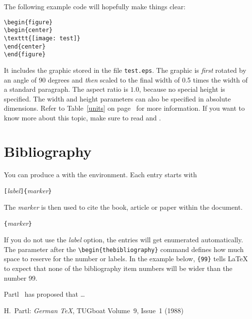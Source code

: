 \pagebreak
The following example code will hopefully make things clear:
\begin{code}
\begin{verbatim}
\begin{figure}
\begin{center}
\texttt{[image: test]}
\end{center}
\end{figure}
\end{verbatim}
\end{code}
It includes the graphic stored in the file \texttt{test.eps}. The
graphic is \emph{first} rotated by an angle of 90 degrees and
\emph{then} scaled to the final width of 0.5 times the width of a
standard paragraph.  The aspect ratio is $1.0$, because no special
height is specified.  The width and height parameters can also be
specified in absolute dimensions. Refer to Table~\ref{units} on
page~\pageref{units} for more information. If you want to know more
about this topic, make sure to read \cite{graphics} and \cite{eps}.

\section{Bibliography}
 
You can produce a  with the 
environment.  Each entry starts with
\begin{lscommand}
\verb|[|\emph{label}\verb|]{|\emph{marker}\verb|}|
\end{lscommand}
The \emph{marker} is then used to cite the book, article or paper
within the document.
\begin{lscommand}
\verb|{|\emph{marker}\verb|}|
\end{lscommand}
If you do not use the \emph{label} option, the entries will get enumerated
automatically.  The parameter after the \verb|\begin{thebibliography}|
command defines how much space to reserve for the number or labels. In the example below,
\verb|{99}| tells \LaTeX{} to expect that none of the bibliography item numbers will be wider
than the number 99.
\enlargethispage{2cm}
\begin{example}
Partl~\cite{pa} has 
proposed that \ldots 
\begin{thebibliography}{99}
 H.~Partl: 
\emph{German \TeX},
TUGboat Volume~9, Issue~1 (1988)
\end{thebibliography}
\end{example}

